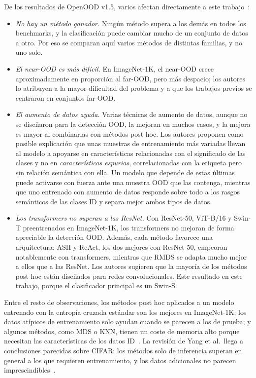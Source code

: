 De los resultados de OpenOOD v1.5, varios afectan directamente a este
trabajo~\cite{openood15}:
\begin{itemize}
  \item \emph{No hay un método ganador.} Ningún método supera a los demás en todos
  los benchmarks, y la clasificación puede cambiar mucho de un conjunto de datos a
  otro. Por eso se comparan aquí varios métodos de distintas familias, y no uno
  solo.
  \item \emph{El near-OOD es más difícil.} En ImageNet-1K, el \AUROC near-OOD crece
  aproximadamente en proporción al far-OOD, pero más despacio; los autores lo
  atribuyen a la mayor dificultad del problema y a que los trabajos previos se
  centraron en conjuntos far-OOD.
  \item \emph{El aumento de datos ayuda.} Varias técnicas de aumento de datos,
  aunque no se diseñaron para la detección OOD, la mejoran en muchos casos, y la
  mejora es mayor al combinarlas con métodos post hoc. Los autores proponen como
  posible explicación que unas muestras de entrenamiento más variadas llevan al
  modelo a apoyarse en características relacionadas con el significado de las
  clases y no en \emph{características espurias}, correlacionadas con la etiqueta
  pero sin relación semántica con ella. Un modelo que depende de estas últimas
  puede activarse con fuerza ante una muestra OOD que las contenga, mientras que
  uno entrenado con aumento de datos responde sobre todo a los rasgos semánticos de
  las clases ID y separa mejor ambos tipos de datos.
  \item \emph{Los transformers no superan a las ResNet.} Con ResNet-50, ViT-B/16 y
  Swin-T preentrenados en ImageNet-1K, los transformers no mejoran de forma
  apreciable la detección OOD. Además, cada método favorece una arquitectura: ASH
  y ReAct, los dos mejores con ResNet-50, empeoran notablemente con transformers,
  mientras que RMDS se adapta mucho mejor a ellos que a las ResNet. Los autores
  sugieren que la mayoría de los métodos post hoc están diseñados para redes
  convolucionales. Este resultado en este trabajo, porque el clasificador
  principal es un Swin-S.
\end{itemize}
Entre el resto de observaciones, los métodos post hoc aplicados a un modelo
entrenado con la entropía cruzada estándar son los mejores en ImageNet-1K; los
datos atípicos de entrenamiento solo ayudan cuando se parecen a los de prueba; y
algunos métodos, como MDS o KNN, tienen un coste de memoria alto porque necesitan
las características de los datos ID~\cite{openood15}. La revisión de Yang et al.\
llega a conclusiones parecidas sobre CIFAR: los métodos solo de inferencia superan
en general a los que requieren entrenamiento, y los datos adicionales no parecen
imprescindibles~\cite{yang2024}.


